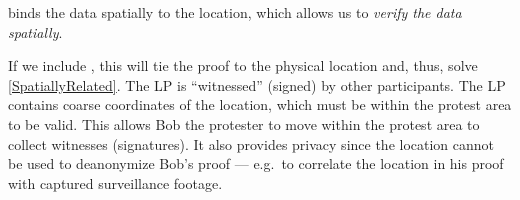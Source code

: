  binds the data spatially to the location, which allows 
us to \emph{verify the data spatially}.

If we include , this will tie the proof to the physical location and, 
thus, solve \cref{SpatiallyRelated}.
The \ac{LP} is \enquote{witnessed} (signed) by other participants.
The \ac{LP} contains coarse coordinates of the location, which must be within 
the protest area to be valid.
This allows Bob the protester to move within the protest area to collect 
witnesses (signatures).
It also provides privacy since the location cannot be used to deanonymize Bob's 
proof --- e.g.\ to correlate the location in his proof with captured 
surveillance footage.


